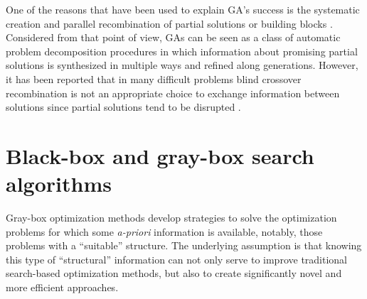   
 One of the reasons that have been used to explain GA's success is the systematic creation and parallel recombination of partial solutions or building blocks \cite{Goldberg:1989}. Considered from that point of view, GAs can be seen as a class of automatic problem decomposition procedures in which information about promising partial solutions is synthesized in multiple ways and refined along generations. However, it has been reported that in many difficult problems blind crossover recombination is not an appropriate choice to exchange information between solutions since partial solutions tend to be disrupted \cite{Watson_et_al:1998}.

 
 


 \section{Black-box and gray-box search algorithms}   \label{sec:BLACK_VS_GRAY}


 
 Gray-box optimization methods \cite{Chicano_et_2014,Whitley:2015}  develop strategies to solve the optimization problems for which some \emph{a-priori} information is available, notably, those problems with a  ``suitable'' structure. The underlying assumption is that knowing this type of ``structural'' information can not only serve to improve traditional search-based optimization methods, but also to create significantly novel and more efficient approaches.

